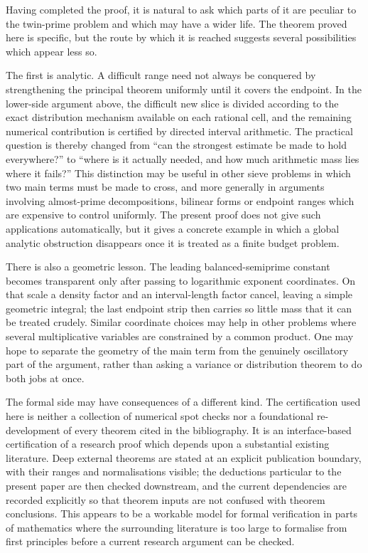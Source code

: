 \documentclass{aomart}
\theoremstyle{definition}
\newcommand{\1}{\mathbf 1}
\begin{document}
Having completed the proof, it is natural to ask which parts of it are peculiar to the twin-prime problem and which may have a wider life.  The theorem proved here is specific, but the route by which it is reached suggests several possibilities which appear less so.

The first is analytic.  A difficult range need not always be conquered by strengthening the principal theorem uniformly until it covers the endpoint.  In the lower-side argument above, the difficult new slice is divided according to the exact distribution mechanism available on each rational cell, and the remaining numerical contribution is certified by directed interval arithmetic.  The practical question is thereby changed from ``can the strongest estimate be made to hold everywhere?'' to ``where is it actually needed, and how much arithmetic mass lies where it fails?''  This distinction may be useful in other sieve problems in which two main terms must be made to cross, and more generally in arguments involving almost-prime decompositions, bilinear forms or endpoint ranges which are expensive to control uniformly.  The present proof does not give such applications automatically, but it gives a concrete example in which a global analytic obstruction disappears once it is treated as a finite budget problem.


There is also a geometric lesson.  The leading balanced-semiprime constant becomes transparent only after passing to logarithmic exponent coordinates.  On that scale a density factor and an interval-length factor cancel, leaving a simple geometric integral; the last endpoint strip then carries so little mass that it can be treated crudely.  Similar coordinate choices may help in other problems where several multiplicative variables are constrained by a common product.  One may hope to separate the geometry of the main term from the genuinely oscillatory part of the argument, rather than asking a variance or distribution theorem to do both jobs at once.

The formal side may have consequences of a different kind.  The certification used here is neither a collection of numerical spot checks nor a foundational re-development of every theorem cited in the bibliography.  It is an interface-based certification of a research proof which depends upon a substantial existing literature.  Deep external theorems are stated at an explicit publication boundary, with their ranges and normalisations visible; the deductions particular to the present paper are then checked downstream, and the current dependencies are recorded explicitly so that theorem inputs are not confused with theorem conclusions.  This appears to be a workable model for formal verification in parts of mathematics where the surrounding literature is too large to formalise from first principles before a current research argument can be checked.
\end{document}
